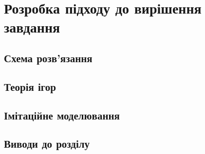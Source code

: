 \section{Розробка підходу до вирішення завдання}
\subsection{Схема розв’язання}
\subsection{Теорія ігор}
\subsection{Імітаційне моделювання}
\subsection{Виводи до розділу}